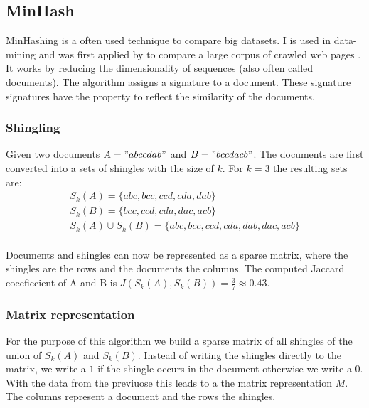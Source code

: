 \subsection{MinHash}
\label{ssec:minhash}

MinHashing is a often used technique to compare big datasets. I is used in data-mining and was first applied by \citeauthor{minhash} to compare a large corpus of crawled web pages \cite{minhash}. It works by reducing the dimensionality of sequences (also often called documents). The algorithm assigns a signature to a document. These signature signatures have the property to reflect the similarity of the documents. \\

\subsubsection{Shingling}

Given two documents $ A = "abccdab" $ and $ B = "bccdacb" $. The documents are first converted into a sets of shingles with the size of $ k $. For $ k = 3 $ the resulting sets are: \\

\begin{equation}
    \begin{split}
        S_k(A) = \{abc, bcc, ccd, cda, dab\} \\
        S_k(B) = \{bcc, ccd, cda, dac, acb\} \\
        S_k(A) \cup S_k(B) = \{abc, bcc, ccd, cda, dab, dac, acb\}
    \end{split}
\end{equation}\\

Documents and shingles can now be represented as a sparse matrix, where the shingles are the rows and the documents the columns. The computed Jaccard coeeficcient of A and B is  $ J(S_k(A),S_k(B)) = \frac{3}{7} \approx 0.43 $.\\

\subsubsection{Matrix representation}

For the purpose of this algorithm we build a sparse matrix of all shingles of the union of $ S_k(A) $ and $ S_k(B) $. Instead of writing the shingles directly to the matrix, we write a $ 1 $ if the shingle occurs in the document otherwise we write a $ 0 $. With the data from the previuose this leads to a the matrix representation $ M $. The columns represent a document and the rows the shingles. \\

